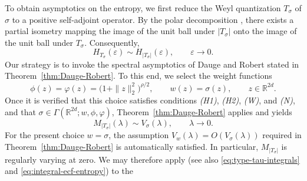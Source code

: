 \documentclass[a4paper,12pt]{article}
\newcommand{\N}{\mathbb{N}}
\newcommand{\R}{\mathbb{R}}
\begin{document}
\iffalse 
\color{blue}
To obtain asymptotics on the entropy,
we first reduce the Weyl quantization $T_\sigma$ of $\sigma$ to a positive
self-adjoint operator. By the polar decomposition
\cite[VIII.3.11]{conway}, there exists a partial isometry mapping the image of the
unit ball under \(|T_\sigma|\) onto the image of the unit ball under \(T_\sigma\).
Consequently,
\[
    H_{T_\sigma}(\varepsilon)\sim H_{|T_\sigma|}(\varepsilon),
    \qquad \varepsilon\to0.
\]
%
Our strategy is to invoke the spectral asymptotics of Dauge and Robert stated in
Theorem~\ref{thm:Dauge-Robert}.
To this end, we select the weight functions
\begin{equation}\label{eq:weight-choice-hypo}
    \phi(z)
    = \varphi(z)
    = \bigl(1+\|z\|_2^2\bigr)^{\rho/2},
    \qquad
    w(z)=\sigma(z),
    \qquad z\in\R^{2d}.
\end{equation}
Once it is verified that this choice satisfies conditions
\emph{(H1)}, \emph{(H2)}, \emph{(W)}, and \emph{(N)}, and that
\(\sigma\in\Gamma(\R^{2d};w,\phi,\varphi)\),
Theorem~\ref{thm:Dauge-Robert} applies and yields
\[
    M_{|T_\sigma|} (\lambda)\sim V_\sigma(\lambda),
    \qquad \lambda\to0.
\]
For the present choice \(w=\sigma\), the assumption \(V_w(\lambda)=O(V_\sigma(\lambda))\) required in
Theorem~\ref{thm:Dauge-Robert} is automatically satisfied.
In particular, \(M_{|T_\sigma|}\) is regularly varying at zero.
We may therefore apply \cite[Theorem~2]{allard2025metricentropyminimaxrisk}
(see also \eqref{eq:type-tau-integrals} and \eqref{eq:integral-ecf-entropy}) to the
\end{document}
